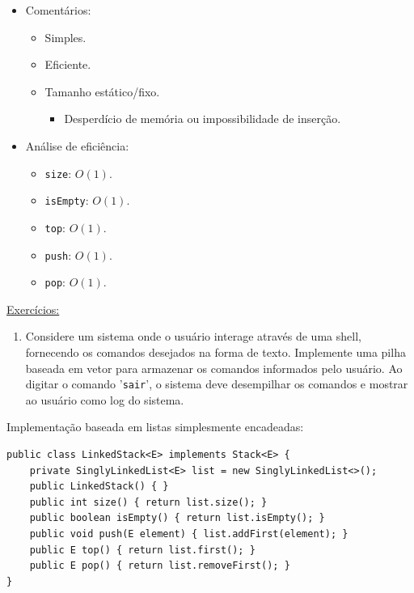 \medskip

\begin{itemize}
	\color{redtext}
	\item Comentários:
	\begin{itemize}
		\item Simples.
		\item Eficiente.
		\item Tamanho estático/fixo.
		\begin{itemize}
			\item Desperdício de memória ou impossibilidade de inserção.
		\end{itemize}
	\end{itemize}
\end{itemize}

\medskip

\begin{itemize}
	\item Análise de eficiência:
	\begin{itemize}
		\item \texttt{size}: $O(1)$.
		\item \texttt{isEmpty}: $O(1)$.
		\item \texttt{top}: $O(1)$.
		\item \texttt{push}: $O(1)$.
		\item \texttt{pop}: $O(1)$.
	\end{itemize}
\end{itemize}

\medskip

\underline{Exercícios:}
\begin{enumerate}
	\item Considere um sistema onde o usuário interage através de uma shell, fornecendo os comandos desejados na forma de texto. Implemente uma pilha baseada em vetor para armazenar os comandos informados pelo usuário. Ao digitar o comando '\texttt{sair}', o sistema deve desempilhar os comandos e mostrar ao usuário como log do sistema.
\end{enumerate}

\clearpage

Implementação baseada em listas simplesmente encadeadas:
\begin{verbatim}
public class LinkedStack<E> implements Stack<E> {
	private SinglyLinkedList<E> list = new SinglyLinkedList<>();
	public LinkedStack() { }
	public int size() { return list.size(); }
	public boolean isEmpty() { return list.isEmpty(); }
	public void push(E element) { list.addFirst(element); }
	public E top() { return list.first(); }
	public E pop() { return list.removeFirst(); }
}
\end{verbatim}

